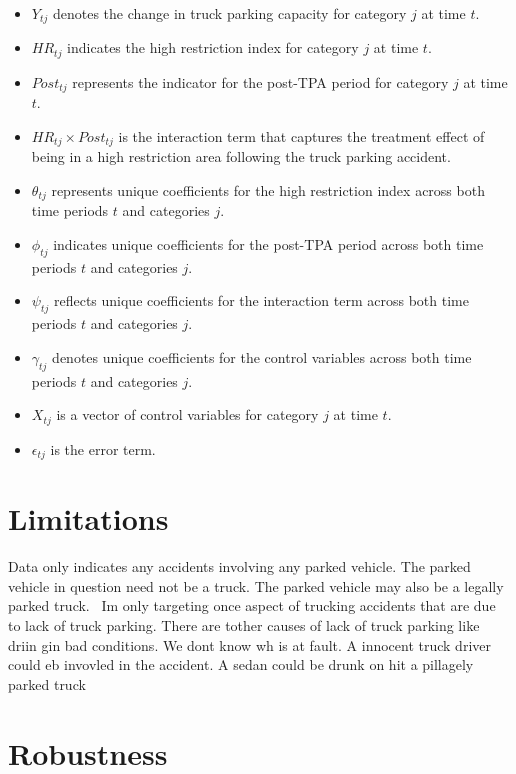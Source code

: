 \documentclass[
  12pt]{article}
\providecommand{\tightlist}{%
  \setlength{\itemsep}{0pt}\setlength{\parskip}{0pt}}\usepackage{longtable,booktabs,array}
\begin{document}
\begin{itemize}
\tightlist
\item
  \(Y_{tj}\) denotes the change in truck parking capacity for category
  \(j\) at time \(t\).
\item
  \(HR_{tj}\) indicates the high restriction index for category \(j\) at
  time \(t\).
\item
  \(Post_{tj}\) represents the indicator for the post-TPA period for
  category \(j\) at time \(t\).
\item
  \(HR_{tj} \times Post_{tj}\) is the interaction term that captures the
  treatment effect of being in a high restriction area following the
  truck parking accident.
\item
  \(\theta_{tj}\) represents unique coefficients for the high
  restriction index across both time periods \(t\) and categories \(j\).
\item
  \(\phi_{tj}\) indicates unique coefficients for the post-TPA period
  across both time periods \(t\) and categories \(j\).
\item
  \(\psi_{tj}\) reflects unique coefficients for the interaction term
  across both time periods \(t\) and categories \(j\).
\item
  \(\gamma_{tj}\) denotes unique coefficients for the control variables
  across both time periods \(t\) and categories \(j\).
\item
  \(X_{tj}\) is a vector of control variables for category \(j\) at time
  \(t\).
\item
  \(\epsilon_{tj}\) is the error term.
\end{itemize}

\section{\texorpdfstring{\textbf{Limitations}}{Limitations}}\label{limitations}

Data only indicates any accidents involving any parked vehicle. The
parked vehicle in question need not be a truck. The parked vehicle may
also be a legally parked truck.~ Im only targeting once aspect of
trucking accidents that are due to lack of truck parking. There are
tother causes of lack of truck parking like driin gin bad conditions. We
dont know wh is at fault. A innocent truck driver could eb invovled in
the accident. A sedan could be drunk on hit a pillagely parked truck

\section{\texorpdfstring{\textbf{Robustness}}{Robustness}}\label{robustness}
\end{document}
